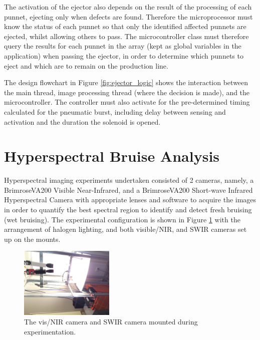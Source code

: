 \documentclass[fleqn,twoside,12pt]{report}
\begin{document}
The activation of the ejector also depends on the result of the processing of each punnet, ejecting only when defects are found. Therefore the microprocessor must know the status of each punnet so that only the identified affected punnets are ejected, whilst allowing others to pass. The microcontroller class must therefore query the results for each punnet in the array (kept as global variables in the application) when passing the ejector, in order to determine which punnets to eject and which are to remain on the production line. 


The design flowchart in Figure \ref{fig:ejector_logic} shows the interaction between the main thread, image processing thread (where the decision is made), and the microcontroller. The controller must also activate for the pre-determined timing calculated for the pneumatic burst, including delay between sensing and activation and the duration the solenoid is opened.


\section{Hyperspectral Bruise Analysis}


Hyperspectral imaging experiments undertaken consisted of 2 cameras, namely, a Brimrose\textregistered VA200 Visible Near-Infrared, and a Brimrose\textregistered VA200 Short-wave Infrared Hyperspectral Camera with appropriate lenses and software to acquire the images in order to quantify the best spectral region to identify and detect fresh bruising (wet bruising). The experimental configuration is shown in Figure \ref{fig:HSI} with the arrangement of halogen lighting, and both visible/NIR, and SWIR cameras set up on the mounts.

\begin{figure}
	\begin{center}
		\includegraphics[width=0.4\textwidth,angle=270]{HSI.jpg}
	\end{center}
	\caption{The vis/NIR camera and SWIR camera mounted during experimentation.}
	\label{fig:HSI}
\end{figure} 
\end{document}
